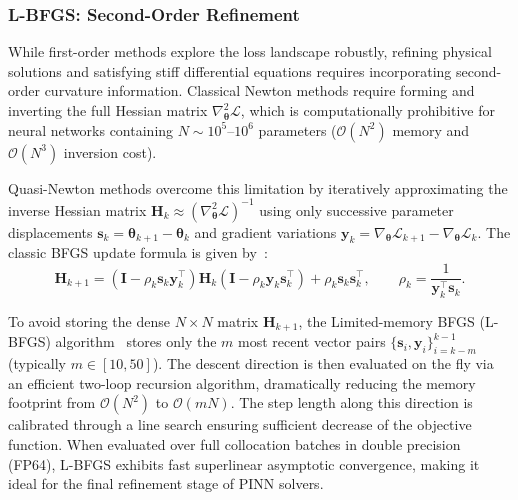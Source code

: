 \subsubsection{L-BFGS: Second-Order Refinement}
\label{subsubsec:lbfgs_optimizer}

While first-order methods explore the loss landscape robustly, refining physical
solutions and satisfying stiff differential equations requires incorporating
second-order curvature information.
Classical Newton methods require forming and inverting the full Hessian matrix
$\nabla_{\boldsymbol{\theta}}^2 \mathcal{L}$, which is computationally prohibitive
for neural networks containing $N \sim 10^5\text{--}10^6$ parameters ($\mathcal{O}(N^2)$
memory and $\mathcal{O}(N^3)$ inversion cost).

Quasi-Newton methods overcome this limitation by iteratively approximating the inverse
Hessian matrix $\boldsymbol{H}_k \approx (\nabla_{\boldsymbol{\theta}}^2 \mathcal{L})^{-1}$
using only successive parameter displacements $\boldsymbol{s}_k = \boldsymbol{\theta}_{k+1} - \boldsymbol{\theta}_k$
and gradient variations $\boldsymbol{y}_k = \nabla_{\boldsymbol{\theta}} \mathcal{L}_{k+1} - \nabla_{\boldsymbol{\theta}} \mathcal{L}_k$.
The classic BFGS update formula is given by~\cite{nocedal1980updating}:
\begin{equation}
    \boldsymbol{H}_{k+1} = (\boldsymbol{I} - \rho_k \boldsymbol{s}_k \boldsymbol{y}_k^\top) \boldsymbol{H}_k (\boldsymbol{I} - \rho_k \boldsymbol{y}_k \boldsymbol{s}_k^\top) + \rho_k \boldsymbol{s}_k \boldsymbol{s}_k^\top , \qquad \rho_k = \frac{1}{\boldsymbol{y}_k^\top \boldsymbol{s}_k} .
    \label{eq:bfgs_inverse_hessian_update}
\end{equation}

To avoid storing the dense $N \times N$ matrix $\boldsymbol{H}_{k+1}$, the
Limited-memory BFGS (L-BFGS) algorithm~\cite{nocedal1980updating, liu1989limited}
stores only the $m$ most recent vector pairs $\{ \boldsymbol{s}_i, \boldsymbol{y}_i \}_{i=k-m}^{k-1}$
(typically $m \in [10, 50]$).
The descent direction is then evaluated on the fly via an efficient two-loop recursion
algorithm, dramatically reducing the memory footprint from $\mathcal{O}(N^2)$ to $\mathcal{O}(m N)$.
The step length along this direction is calibrated through a line search ensuring
sufficient decrease of the objective function.
When evaluated over full collocation batches in double precision (FP64), L-BFGS exhibits
fast superlinear asymptotic convergence, making it ideal for the final refinement stage
of PINN solvers.


